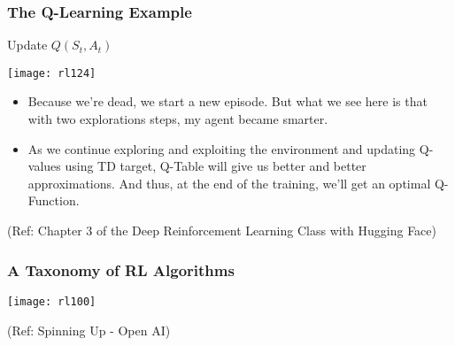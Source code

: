 \begin{frame}[fragile]\frametitle{The Q-Learning Example}

Update $Q(S_t, A_t)$

\begin{center}
\texttt{[image: rl124]}

\end{center}

\begin{itemize}
\item Because we're dead, we start a new episode. But what we see here is that with two explorations steps, my agent became smarter.
\item As we continue exploring and exploiting the environment and updating Q-values using TD target, Q-Table will give us better and better approximations. And thus, at the end of the training, we'll get an optimal Q-Function.
\end{itemize}



{\tiny (Ref: Chapter 3 of the Deep Reinforcement Learning Class with Hugging Face)}

\end{frame}



\begin{frame}[fragile]\frametitle{A Taxonomy of RL Algorithms}

\begin{center}
\texttt{[image: rl100]}
\end{center}

{\tiny (Ref: Spinning Up - Open AI)}
\end{frame}

